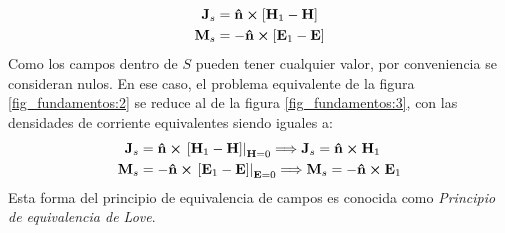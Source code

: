 \begin{align}
\mathbf{J}_s &= \bm{\mathbf{\hat{n}}}\boldsymbol{\times}\left[\mathbf{H}_1 - \mathbf{H}\right]
\label{ec_fundamentos:28}\\
\mathbf{M}_s &= - \bm{\mathbf{\hat{n}}}\boldsymbol{\times}\left[\mathbf{E}_1 - \mathbf{E}\right]
\label{ec_fundamentos:29}
\end{align}
Como los campos dentro de $S$ pueden tener cualquier valor, por conveniencia se consideran nulos. En ese caso, el problema equivalente de la figura \ref{fig_fundamentos:2} se reduce al de la figura \ref{fig_fundamentos:3}, con las densidades de corriente equivalentes siendo iguales a:
\begin{align}
\mathbf{J}_s &= \bm{\mathbf{\hat{n}}}\boldsymbol{\times}\left.\left[\mathbf{H}_1 - \mathbf{H}\right]\right|_{\mathbf{H} = 0} \Longrightarrow \mathbf{J}_s = \bm{\mathbf{\hat{n}}}\boldsymbol{\times}\mathbf{H}_1
\label{ec_fundamentos:30}\\
\mathbf{M}_s &= - \bm{\mathbf{\hat{n}}}\boldsymbol{\times}\left.\left[\mathbf{E}_1 - \mathbf{E}\right]\right|_{\mathbf{E} = 0} \Longrightarrow \mathbf{M}_s = - \bm{\mathbf{\hat{n}}}\boldsymbol{\times}\mathbf{E}_1
\label{ec_fundamentos:31}
\end{align}
Esta forma del principio de equivalencia de campos es conocida como \emph{Principio de equivalencia de Love}.
